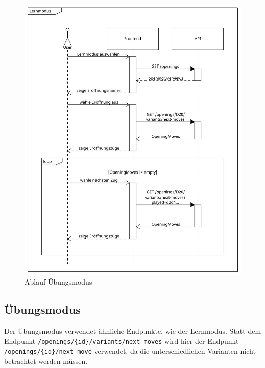 \begin{figure}[h]
    \includegraphics[width=\linewidth]{images/diagrams/sd_opening_training}
    \caption{Ablauf Übungsmodus}
    \label{fig:sd_opening_training}
\end{figure}

\subsection{Übungsmodus}
Der Übungsmodus verwendet ähnliche Endpunkte, wie der Lernmodus. Statt dem Endpunkt \lstinline|/openings/{id}/variants/next-moves| wird hier der Endpunkt \lstinline|/openings/{id}/next-move| verwendet, da die unterschiedlichen Varianten nicht betrachtet werden müssen.


